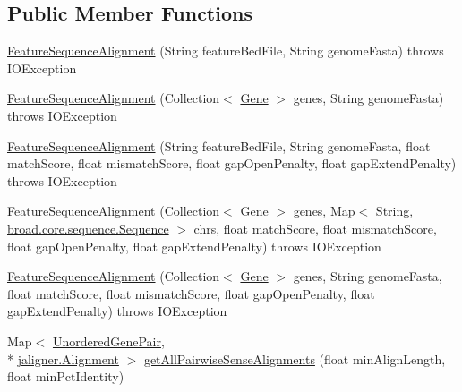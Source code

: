 \subsection*{Public Member Functions}
\begin{DoxyCompactItemize}
\item 
\hyperlink{classumms_1_1core_1_1alignment_1_1_feature_sequence_alignment_ab35fcf26aae378b32764e85217562ba1}{Feature\+Sequence\+Alignment} (String feature\+Bed\+File, String genome\+Fasta)  throws I\+O\+Exception 
\item 
\hyperlink{classumms_1_1core_1_1alignment_1_1_feature_sequence_alignment_a11d8045bdeea5ef20ae6437a1db80e96}{Feature\+Sequence\+Alignment} (Collection$<$ \hyperlink{classumms_1_1core_1_1annotation_1_1_gene}{Gene} $>$ genes, String genome\+Fasta)  throws I\+O\+Exception 
\item 
\hyperlink{classumms_1_1core_1_1alignment_1_1_feature_sequence_alignment_aaaff665576cdbcf265e150ff167dfabb}{Feature\+Sequence\+Alignment} (String feature\+Bed\+File, String genome\+Fasta, float match\+Score, float mismatch\+Score, float gap\+Open\+Penalty, float gap\+Extend\+Penalty)  throws I\+O\+Exception 
\item 
\hyperlink{classumms_1_1core_1_1alignment_1_1_feature_sequence_alignment_a33614e453036f115a7755c4d809cd768}{Feature\+Sequence\+Alignment} (Collection$<$ \hyperlink{classumms_1_1core_1_1annotation_1_1_gene}{Gene} $>$ genes, Map$<$ String, \hyperlink{classbroad_1_1core_1_1sequence_1_1_sequence}{broad.\+core.\+sequence.\+Sequence} $>$ chrs, float match\+Score, float mismatch\+Score, float gap\+Open\+Penalty, float gap\+Extend\+Penalty)  throws I\+O\+Exception 
\item 
\hyperlink{classumms_1_1core_1_1alignment_1_1_feature_sequence_alignment_aec32e5a32e6a269fd93d9e62db8d5922}{Feature\+Sequence\+Alignment} (Collection$<$ \hyperlink{classumms_1_1core_1_1annotation_1_1_gene}{Gene} $>$ genes, String genome\+Fasta, float match\+Score, float mismatch\+Score, float gap\+Open\+Penalty, float gap\+Extend\+Penalty)  throws I\+O\+Exception 
\item 
Map$<$ \hyperlink{classumms_1_1core_1_1alignment_1_1_feature_sequence_alignment_1_1_unordered_gene_pair}{Unordered\+Gene\+Pair}, \\*
\hyperlink{classjaligner_1_1_alignment}{jaligner.\+Alignment} $>$ \hyperlink{classumms_1_1core_1_1alignment_1_1_feature_sequence_alignment_a335945731d4a8ddcca3b130106172247}{get\+All\+Pairwise\+Sense\+Alignments} (float min\+Align\+Length, float min\+Pct\+Identity)

\end{DoxyCompactItemize}
